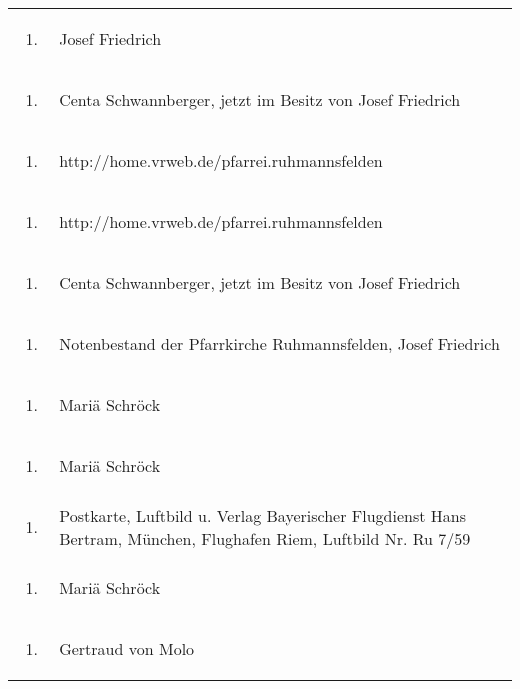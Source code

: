 \begin{flushleft}
\begin{supertabular}{m{1.2409999cm}m{14.604cm}}
\begin{enumerate}
\item
\end{enumerate}
 &
Josef Friedrich\\
\begin{enumerate}
\item
\end{enumerate}
 &
Centa Schwannberger, jetzt im Besitz von Josef Friedrich\\
\begin{enumerate}
\item
\end{enumerate}
 &
http://home.vrweb.de/pfarrei.ruhmannsfelden\\
\begin{enumerate}
\item
\end{enumerate}
 &
http://home.vrweb.de/pfarrei.ruhmannsfelden\\
\begin{enumerate}
\item
\end{enumerate}
 &
Centa Schwannberger, jetzt im Besitz von Josef Friedrich\\
\begin{enumerate}
\item
\end{enumerate}
 &
Notenbestand der Pfarrkirche Ruhmannsfelden, Josef Friedrich\\
\begin{enumerate}
\item
\end{enumerate}
 &
Mariä Schröck\\
\begin{enumerate}
\item
\end{enumerate}
 &
Mariä Schröck\\
\begin{enumerate}
\item
\end{enumerate}
 &
Postkarte, Luftbild u. Verlag Bayerischer Flugdienst Hans Bertram,
München, Flughafen Riem, Luftbild Nr. Ru 7/59\\
\begin{enumerate}
\item
\end{enumerate}
 &
Mariä Schröck\\
\begin{enumerate}
\item
\end{enumerate}
 &
Gertraud von Molo\\

\end{supertabular}
\end{flushleft}
